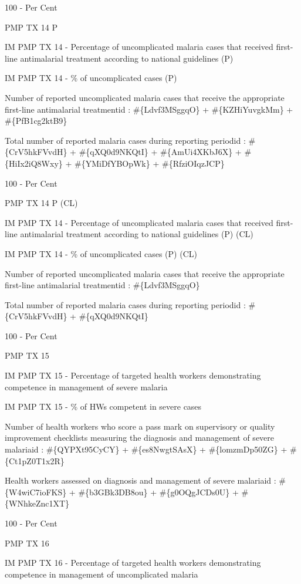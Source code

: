\documentclass[]{book}
\begin{document}
100 - Per Cent

PMP TX 14 P

IM PMP TX 14 - Percentage of uncomplicated malaria cases that received first-line antimalarial treatment according to national guidelines (P)

IM PMP TX 14 - \% of uncomplicated cases (P)

Number of reported uncomplicated malaria cases that receive the appropriate first-line antimalarial treatmentid : \#\{Ldvf3MSggqO\} + \#\{KZHiYuvgkMm\} + \#\{PfB1cg2ktB9\}

Total number of reported malaria cases during reporting periodid : \#\{CrV5hkFVvdH\} + \#\{qXQ0d9NKQtI\} + \#\{AmUi4XKbJ6X\} + \#\{HiIx2iQ8Wxy\} + \#\{YMiDfYBOpWk\} + \#\{RfziOIqzJCP\}

100 - Per Cent

PMP TX 14 P (CL)

IM PMP TX 14 - Percentage of uncomplicated malaria cases that received first-line antimalarial treatment according to national guidelines (P) (CL)

IM PMP TX 14 - \% of uncomplicated cases (P) (CL)

Number of reported uncomplicated malaria cases that receive the appropriate first-line antimalarial treatmentid : \#\{Ldvf3MSggqO\}

Total number of reported malaria cases during reporting periodid : \#\{CrV5hkFVvdH\} + \#\{qXQ0d9NKQtI\}

100 - Per Cent

PMP TX 15

IM PMP TX 15 - Percentage of targeted health workers demonstrating competence in management of severe malaria

IM PMP TX 15 - \% of HWs competent in severe cases

Number of health workers who score a pass mark on supervisory or quality improvement checklists measuring the diagnosis and management of severe malariaid : \#\{QYPXt95CyCY\} + \#\{es8NwgtSAsX\} + \#\{lomzmDp50ZG\} + \#\{Ct1pZ0T1x2R\}

Health workers assessed on diagnosis and management of severe malariaid : \#\{W4wiC7ioFKS\} + \#\{b3GBk3DB8ou\} + \#\{g0OQgJCDs0U\} + \#\{WNhkeZnc1XT\}

100 - Per Cent

PMP TX 16

IM PMP TX 16 - Percentage of targeted health workers demonstrating competence in management of uncomplicated malaria
\end{document}
